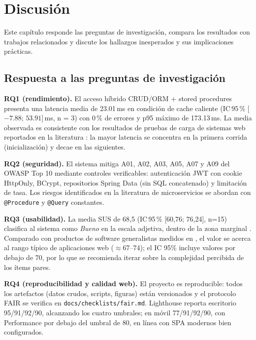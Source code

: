 \chapter{Discusión}
\label{cap:discusion}

Este capítulo responde las preguntas de investigación, compara los resultados con
trabajos relacionados y discute los hallazgos inesperados y sus implicaciones
prácticas.

\section{Respuesta a las preguntas de investigación}

\textbf{RQ1 (rendimiento).} El acceso híbrido CRUD/ORM + stored procedures presenta
una latencia media de 23.01\,ms en condición de cache caliente (IC\,95\,\%
[$-7.88$; $53.91$]\,ms, n = 3) con 0\,\% de errores y p95 máximo de 173.13\,ms.
La media observada es consistente con los resultados de pruebas de carga de
sistemas web reportados en la literatura \cite{jiang2015,jiang2009}: la mayor
latencia se concentra en la primera corrida (inicialización) y decae en las
siguientes.

\textbf{RQ2 (seguridad).} El sistema mitiga A01, A02, A03, A05, A07 y A09 del
OWASP Top 10 \cite{owasp2021} mediante controles verificables: autenticación JWT
con cookie HttpOnly, BCrypt, repositorios Spring Data (sin SQL concatenado) y
limitación de tasa. Los riesgos identificados en la literatura de microservicios
\cite{soldani2018,waseem2021,taibi2018} se abordan con \texttt{@Procedure} y
\texttt{@Query} constantes.

\textbf{RQ3 (usabilidad).} La media SUS de 68,5 (IC\,95\,\% [60,76; 76,24], n=15)
clasifica al sistema como \emph{Bueno} en la escala adjetiva, dentro de la zona
marginal \cite{bangor2009,bangor2008}. Comparado con productos de software
generalistas medidos en \cite{kortum2013}, el valor se acerca al rango típico de
aplicaciones web ($\approx$67--74); el IC 95\% incluye valores por debajo de 70, por
lo que se recomienda iterar sobre la complejidad percibida de los ítems pares.

\textbf{RQ4 (reproducibilidad y calidad web).} El proyecto es reproducible: todos
los artefactos (datos crudos, scripts, figuras) están versionados y el protocolo
FAIR se verifica en \texttt{docs/checklists/fair.md}. Lighthouse reporta escritorio
95/91/92/90, alcanzando los cuatro umbrales; en móvil 77/91/92/90, con Performance
por debajo del umbral de 80, en línea con SPA modernos bien configurados.

